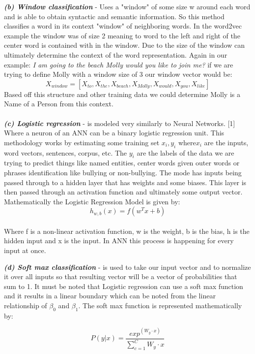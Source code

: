 \documentclass[12pt,a4paper]{report}
\begin{document}
\textbf{\textsl{ (b) Window classification}} - Uses a "window" of some size w around each word and is able to obtain syntactic and semantic information. So this method classifies a word in its context "window" of neighboring words. In the word2vec example the window was of size 2 meaning to word to the left and right of the center word is contained with in the window. Due to the size of the window can ultimately determine the context of the word representation. Again in our example: \emph{ I am going to the beach Molly would you like to join me?} if we are trying to define Molly with a window size of 3 our window vector would be: 
$$ X_{window} = [X_{to},X_{the},X_{beach},X_{Molly},X_{would},X_{you},X_{like}] $$
Based off this structure and other training data we could determine Molly is a Name of a Person from this context.
\\\\
\textbf{\textsl{ (c) Logistic regression}} - is modeled very similarly to Neural Networks. [1] Where a neuron of an ANN can be a binary logistic regression unit. This methodology works by estimating some training set ${x_{i},y_{i}}$ where$ x_{i}$ are the inputs, word vectors, sentences, corpus, etc. The $y_{i} $ are the labels of the data we are trying to predict things like named entities, center words given outer words or phrases identification like bullying or non-bullying. The mode has inputs being passed through to a hidden layer that has weights and some biases. This layer is then passed through an activation function and ultimately some output vector. Mathematically the Logistic Regression Model is given by: $$ h_{w,b}(x) = f(w^{T}x+b) $$ \\
Where f is a non-linear activation function, w is the weight, b is the bias, h is the hidden input and x is the input. In ANN this process is happening for every input at once. 

\textbf{\textsl{ (d) Soft max classification}} - is used to take our input vector and to normalize it over all inputs so that resulting vector will be a vector of probabilities that sum to 1. It must be noted that Logistic regression can use a soft max function and it results in a linear boundary which can be noted from the linear relationship of $ \beta_{0} $ and $\beta_{1}$. The soft max function is represented mathematically by: 

$$ P(y | x ) = \frac{exp^(W_{y} \cdot x)}{\sum_{c=1}^{C}{W_{y} \cdot x}} $$
\end{document}
